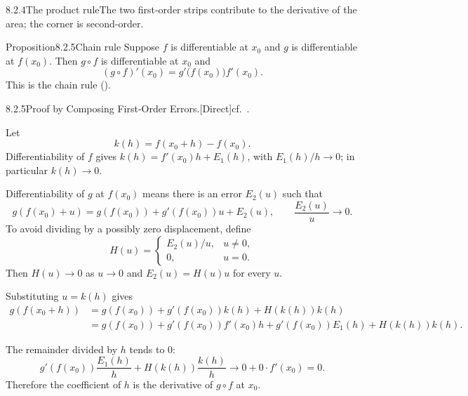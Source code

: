\documentclass[main.tex]{subfiles}
\begin{document}
\begin{Fig}{8.2.4}{The product rule}{The two first-order strips contribute to the
derivative of the area; the corner is second-order.}
\end{Fig}

\begin{Obj}{Proposition}{8.2.5}{Chain rule}
Suppose $f$ is differentiable at $x_0$ and $g$ is differentiable at $f(x_0)$. Then
$g\circ f$ is differentiable at $x_0$ and
\[
  (g\circ f)'(x_0)=g'\bigl(f(x_0)\bigr)f'(x_0).
\]
This is the chain rule ().
\end{Obj}

\begin{Prf}{8.2.5}{Proof by Composing First-Order Errors.}{[Direct]\quad cf.\ .}
\item Let
  \[
    k(h)=f(x_0+h)-f(x_0).
  \]
  Differentiability of $f$ gives $k(h)=f'(x_0)h+E_1(h)$, with $E_1(h)/h\to0$; in particular
  $k(h)\to0$.
\item Differentiability of $g$ at $f(x_0)$ means there is an error $E_2(u)$ such that
  \[
    g(f(x_0)+u)=g(f(x_0))+g'(f(x_0))u+E_2(u),
    \qquad \frac{E_2(u)}{u}\to0 .
  \]
  To avoid dividing by a possibly zero displacement, define
  \[
    H(u)=
    \begin{cases}
      E_2(u)/u, & u\ne0,\\
      0, & u=0.
    \end{cases}
  \]
  Then $H(u)\to0$ as $u\to0$ and $E_2(u)=H(u)u$ for every $u$.
\item Substituting $u=k(h)$ gives
  \[
  \begin{aligned}
    g(f(x_0+h))
    &=
    g(f(x_0))+g'(f(x_0))k(h)+H(k(h))k(h)\\
    &=
    g(f(x_0))+g'(f(x_0))f'(x_0)h
      +g'(f(x_0))E_1(h)+H(k(h))k(h).
  \end{aligned}
  \]
\item The remainder divided by $h$ tends to $0$:
  \[
    g'(f(x_0))\frac{E_1(h)}{h}
    +
    H(k(h))\frac{k(h)}{h}
    \longrightarrow
    0+0\cdot f'(x_0)=0.
  \]
  Therefore the coefficient of $h$ is the derivative of $g\circ f$ at $x_0$.
\end{Prf}
\end{document}
